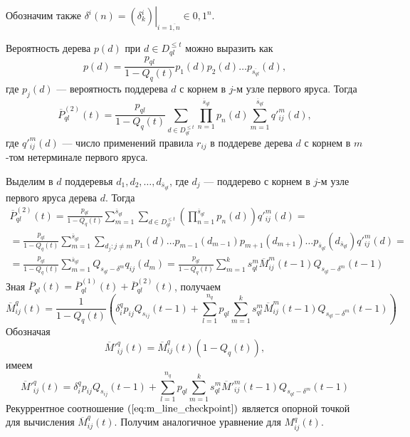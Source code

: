 \documentclass[12pt]{article}
\renewcommand{\leq}{\leqslant}
\begin{document}
Обозначим также $\delta^i(n) = \left. \left( \delta^i_k \right) \right|_{i = \overline{1, n}} \in {0, 1}^n$.

Вероятность дерева $p(d)$ при $d \in D^{\leq t}_{ql}$ можно выразить как
\begin{equation*}
	p(d) = \frac{p_{ql}}{1 - Q_q(t)} p_1(d) p_2(d) \ldots p_{\overline{s_{ql}}}(d),
\end{equation*}
где $p_j(d)$ --- вероятность поддерева $d$ с корнем в $j$-м узле первого яруса. Тогда
\begin{equation*}
	\overline{P}^{(2)}_{ql}(t) = \frac{p_{ql}}{1 - Q_q(t)} \sum_{d \in D^{\leq t}_{ql}} \prod_{n=1}^{\overline{s}_{ql}} p_n(d) \sum_{m = 1}^{\overline{s}_{ql}} q'^m_{ij}(d),
\end{equation*}
где $q'^m_{ij}(d)$ --- число применений правила $r_{ij}$ в поддереве дерева $d$ с корнем в $m$-том нетерминале первого яруса.

Выделим в $d$ поддеревья $d_1, d_2, \ldots, d_{\overline{s}_{ql}}$, где $d_j$ --- поддерево с корнем в $j$-м узле первого яруса дерева $d$. Тогда
\begin{multline*}
	\overline{P}^{(2)}_{ql}(t) = \frac{p_{ql}}{1 - Q_q(t)} \sum_{m = 1}^{\overline{s}_{ql}} \sum_{d \in D^{\leq t}_{ql}} \left( \prod_{n = 1}^{\overline{s}_{ql}} p_n(d) \right) q'^m_{ij}(d) = \\
	= \frac{p_{ql}}{1 - Q_q(t)} \sum_{m = 1}^{\overline{s}_{ql}} \sum_{d_j : j \neq m} p_1(d) \ldots p_{m-1}(d_{m-1}) p_{m+1}(d_{m+1}) \ldots p_{\overline{s}_{ql}}(d_{\overline{s}_{ql}}) q'^m_{ij}(d) = \\
	= \frac{p_{ql}}{1 - Q_q(t)} \sum_{m = 1}^{\overline{s}_{ql}} Q_{s_{ql} - \delta^m} q_{ij}(d_m) = \frac{p_{ql}}{1 - Q_q(t)} \sum_{m = 1}^k s^m_{ql} \overline{M}^m_{ij}(t-1) Q_{s_{ql} - \delta^m}(t - 1)
\end{multline*}
Зная $\overline{P}_{ql}(t) = \overline{P}^{(1)}_{ql}(t) + \overline{P}^{(2)}_{ql}(t)$, получаем
\begin{equation*}
	\overline{M}^q_{ij}(t) = \frac{1}{1 - Q_q(t)} \left( \delta^q_i p_{ij} Q_{s_{ij}}(t - 1) + \sum_{l = 1}^{n_q} p_{ql} \sum_{m = 1}^k s^m_{ql} \overline{M}^m_{ij}(t - 1) Q_{s_{ql} - \delta^m}(t - 1) \right)
\end{equation*}
Обозначая
\begin{equation*}
	\overline{M}'^q_{ij}(t) = \overline{M}^q_{ij}(t) (1 - Q_q(t)),
\end{equation*}
имеем
\begin{equation}
\label{eq:m_line_checkpoint}
	\overline{M}'^q_{ij}(t) = \delta^q_i p_{ij} Q_{s_{ij}}(t - 1) + \sum_{l = 1}^{n_q} p_{ql} \sum_{m = 1}^k s^m_{ql} \overline{M}'^m_{ij}(t - 1) Q_{s_{ql} - \delta^m}(t - 1)
\end{equation}
Рекуррентное соотношение $(\ref{eq:m_line_checkpoint})$ является опорной точкой для вычисления $\overline{M}^q_{ij}(t)$. Получим аналогичное уравнение для $M^q_{ij}(t)$.
\end{document}
